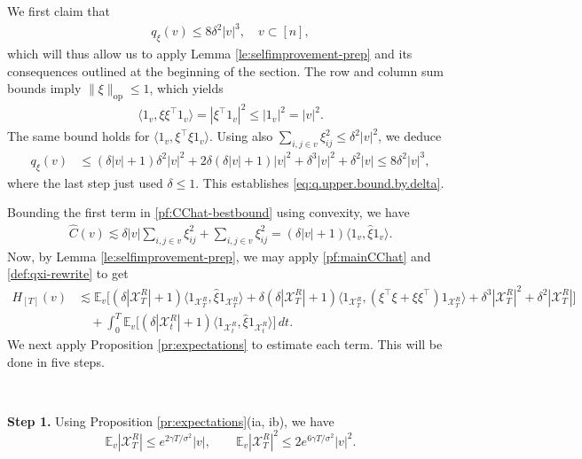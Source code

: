 \documentclass[11pt,reqno]{amsart}
\numberwithin{equation}{section}
\theoremstyle{definition}
\def\CC{{C}}
\def\E{{\mathbb E}}
\def\X{{\mathcal X}}
\begin{document}
We first claim that
\begin{align} \label{eq:q.upper.bound.by.delta}
	q_{\xi}(v)\le 8\delta^2|v|^3, \quad v \subset [n],
\end{align}
which will thus allow us to apply Lemma \ref{le:selfimprovement-prep} and its consequences outlined at the beginning of the section.
The row and column sum bounds imply $\|\xi\|_{\mathrm{op}} \le 1$, which yields
\begin{align*}
	\langle 1_v, \xi\xi^\top 1_v\rangle = |\xi^\top 1_v|^2 \le |1_v|^2 = |v|^2.
\end{align*}
The same bound holds for $\langle 1_v, \xi^\top\xi 1_v\rangle$.  Using also $\sum_{i,j\in v}\xi^2_{ij}\le \delta^2|v|^2$,  we deduce 
\begin{align*}
	q_{\xi}(v) &\le (\delta|v|+1)\delta^2|v|^2 + 2\delta(\delta|v| +1) |v|^2  + \delta^3|v|^2  +\delta^2|v|  \le 8\delta^2|v|^3,
\end{align*}
where the last step just used  $\delta \le 1$. This establishes \eqref{eq:q.upper.bound.by.delta}.

Bounding the first term in \eqref{pf:CChat-bestbound} using convexity, we have
\begin{align*}
	\widehat{\CC}(v) \lesssim \delta |v| \sum_{i,j \in v} \xi_{ij}^2 +   \sum_{i,j \in v} \xi_{ij}^2 = (\delta |v|+1) \langle 1_v, \widehat{\xi} 1_v\rangle .
\end{align*}
Now, by Lemma \ref{le:selfimprovement-prep}, we may apply \eqref{pf:mainCChat} and \eqref{def:qxi-rewrite} to get
\begin{align} 
	H_{[T]}(v) & \lesssim \E_v\Big[(\delta|\X_T^{R}| +1)\langle 1_{\X_T^{R}}, \widehat{\xi} 1_{\X_T^{R}}\rangle + \delta (\delta|\X_T^{R}|+1)\langle 1_{\X_T^{R}}, (\xi^\top \xi + \xi\xi^\top) 1_{\X_T^{R}}\rangle  + \delta^3 |\X_T^{R}|^2  + \delta^2 |\X_T^{R}|\Big] \nonumber  \\
	&\quad + \int_0^T \E_v\big[(\delta |\X_t^{R}|+1) \langle 1_{\X_t^{R}}, \widehat{\xi} 1_{\X_t^{R}}\rangle  \big]\,dt.   \label{pf:setwise-main1}
\end{align}
We next apply Proposition \ref{pr:expectations} to estimate each term.
This will be done in five steps.

{ \ }

\noindent\textbf{Step 1.}
Using Proposition \ref{pr:expectations}(ia, ib), we have
\begin{equation}
	\E_v |\X_T^{R}|  \le e^{2\gamma T/\sigma^2}  |v| ,\qquad \E_v |\X_T^{R}|^2  \le 2e^{6\gamma T/\sigma^2}  |v|^2   .\label{pf:setwise-exp1}
\end{equation} 
\end{document}

